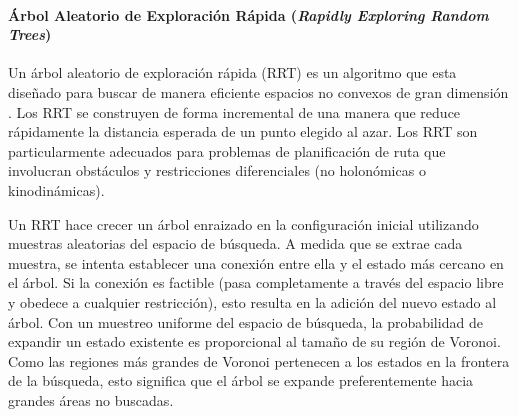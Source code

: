 

\paragraph{\'Arbol Aleatorio de Exploraci\'on R\'apida (\textit{Rapidly Exploring Random Trees})}

Un \'arbol aleatorio de exploraci\'on r\'apida (RRT) es un algoritmo que esta dise\~nado para 
buscar de manera eficiente espacios no convexos de gran dimensi\'on \cite{bry2011rapidly}. Los 
RRT se construyen de forma incremental de una manera que reduce r\'apidamente la distancia esperada 
de un punto elegido al azar. Los RRT son particularmente adecuados para problemas de planificaci\'on 
de ruta que involucran obst\'aculos y restricciones diferenciales (no holon\'omicas o kinodin\'amicas).

Un RRT hace crecer un \'arbol enraizado en la configuraci\'on inicial utilizando muestras aleatorias 
del espacio de b\'usqueda. A medida que se extrae cada muestra, se intenta establecer una conexi\'on 
entre ella y el estado m\'as cercano en el \'arbol. Si la conexi\'on es factible (pasa completamente 
a trav\'es del espacio libre y obedece a cualquier restricci\'on), esto resulta en la adici\'on del 
nuevo estado al \'arbol. Con un muestreo uniforme del espacio de b\'usqueda, la probabilidad de expandir 
un estado existente es proporcional al tama\~no de su regi\'on de Voronoi. Como las regiones m\'as 
grandes de Voronoi pertenecen a los estados en la frontera de la b\'usqueda, esto significa que el 
\'arbol se expande preferentemente hacia grandes \'areas no buscadas. 

